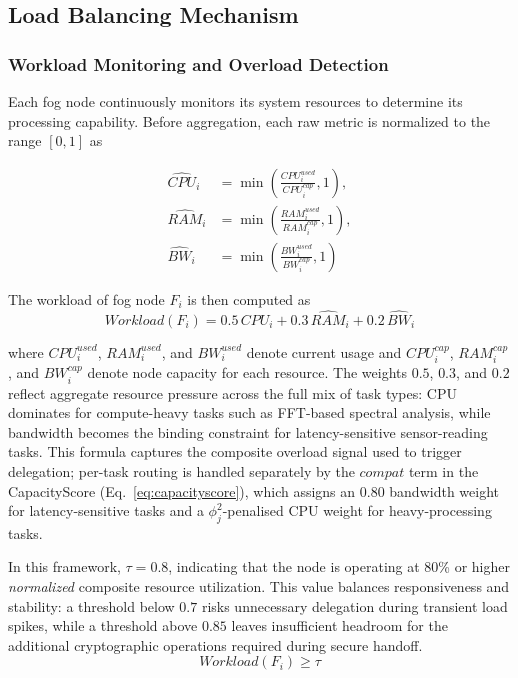 \documentclass[conference]{IEEEtran}
\begin{document}
    \subsection{Load Balancing Mechanism}
    \label{sec:lb}
    \subsubsection{Workload Monitoring and Overload Detection}

    Each fog node continuously monitors its system resources to determine its processing capability. Before aggregation, each raw metric is normalized to the range $[0,1]$ as

    \begin{equation}
    \begin{aligned}
    \widehat{CPU}_i &= \min\!\left(\frac{CPU_i^{used}}{CPU_i^{cap}},1\right),\\
    \widehat{RAM}_i &= \min\!\left(\frac{RAM_i^{used}}{RAM_i^{cap}},1\right),\\
    \widehat{BW}_i &= \min\!\left(\frac{BW_i^{used}}{BW_i^{cap}},1\right)
    \end{aligned}
    \end{equation}

    The workload of fog node $F_i$ is then computed as
    \begin{equation}
    Workload(F_i) = 0.5\,\widehat{CPU}_i + 0.3\,\widehat{RAM}_i + 0.2\,\widehat{BW}_i
    \label{eq:workload-definition}
    \end{equation}

    where $CPU_i^{used}$, $RAM_i^{used}$, and $BW_i^{used}$ denote current usage and $CPU_i^{cap}$, $RAM_i^{cap}$, and $BW_i^{cap}$ denote node capacity for each resource. The weights $0.5$, $0.3$, and $0.2$ reflect aggregate resource pressure across the full mix of task types: CPU dominates for compute-heavy tasks such as FFT-based spectral analysis, while bandwidth becomes the binding constraint for latency-sensitive sensor-reading tasks. This formula captures the composite overload signal used to trigger delegation; per-task routing is handled separately by the $compat$ term in the CapacityScore (Eq.~\eqref{eq:capacityscore}), which assigns an 0.80 bandwidth weight for latency-sensitive tasks and a $\phi_j^2$-penalised CPU weight for heavy-processing tasks.

    In this framework, $\tau = 0.8$, indicating that the node is operating at 80\% or higher \emph{normalized} composite resource utilization. This value balances responsiveness and stability: a threshold below $0.7$ risks unnecessary delegation during transient load spikes, while a threshold above $0.85$ leaves insufficient headroom for the additional cryptographic operations required during secure handoff.
    \begin{equation}
    Workload(F_i) \geq \tau
    \end{equation}
\end{document}
